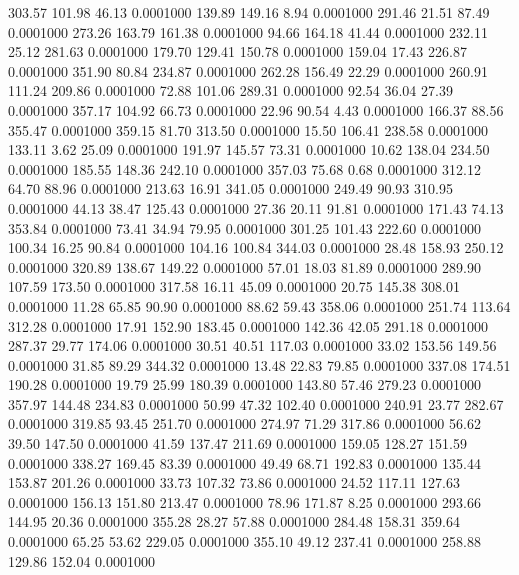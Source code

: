  303.57  101.98   46.13   0.0001000
 139.89  149.16    8.94   0.0001000
 291.46   21.51   87.49   0.0001000
 273.26  163.79  161.38   0.0001000
  94.66  164.18   41.44   0.0001000
 232.11   25.12  281.63   0.0001000
 179.70  129.41  150.78   0.0001000
 159.04   17.43  226.87   0.0001000
 351.90   80.84  234.87   0.0001000
 262.28  156.49   22.29   0.0001000
 260.91  111.24  209.86   0.0001000
  72.88  101.06  289.31   0.0001000
  92.54   36.04   27.39   0.0001000
 357.17  104.92   66.73   0.0001000
  22.96   90.54    4.43   0.0001000
 166.37   88.56  355.47   0.0001000
 359.15   81.70  313.50   0.0001000
  15.50  106.41  238.58   0.0001000
 133.11    3.62   25.09   0.0001000
 191.97  145.57   73.31   0.0001000
  10.62  138.04  234.50   0.0001000
 185.55  148.36  242.10   0.0001000
 357.03   75.68    0.68   0.0001000
 312.12   64.70   88.96   0.0001000
 213.63   16.91  341.05   0.0001000
 249.49   90.93  310.95   0.0001000
  44.13   38.47  125.43   0.0001000
  27.36   20.11   91.81   0.0001000
 171.43   74.13  353.84   0.0001000
  73.41   34.94   79.95   0.0001000
 301.25  101.43  222.60   0.0001000
 100.34   16.25   90.84   0.0001000
 104.16  100.84  344.03   0.0001000
  28.48  158.93  250.12   0.0001000
 320.89  138.67  149.22   0.0001000
  57.01   18.03   81.89   0.0001000
 289.90  107.59  173.50   0.0001000
 317.58   16.11   45.09   0.0001000
  20.75  145.38  308.01   0.0001000
  11.28   65.85   90.90   0.0001000
  88.62   59.43  358.06   0.0001000
 251.74  113.64  312.28   0.0001000
  17.91  152.90  183.45   0.0001000
 142.36   42.05  291.18   0.0001000
 287.37   29.77  174.06   0.0001000
  30.51   40.51  117.03   0.0001000
  33.02  153.56  149.56   0.0001000
  31.85   89.29  344.32   0.0001000
  13.48   22.83   79.85   0.0001000
 337.08  174.51  190.28   0.0001000
  19.79   25.99  180.39   0.0001000
 143.80   57.46  279.23   0.0001000
 357.97  144.48  234.83   0.0001000
  50.99   47.32  102.40   0.0001000
 240.91   23.77  282.67   0.0001000
 319.85   93.45  251.70   0.0001000
 274.97   71.29  317.86   0.0001000
  56.62   39.50  147.50   0.0001000
  41.59  137.47  211.69   0.0001000
 159.05  128.27  151.59   0.0001000
 338.27  169.45   83.39   0.0001000
  49.49   68.71  192.83   0.0001000
 135.44  153.87  201.26   0.0001000
  33.73  107.32   73.86   0.0001000
  24.52  117.11  127.63   0.0001000
 156.13  151.80  213.47   0.0001000
  78.96  171.87    8.25   0.0001000
 293.66  144.95   20.36   0.0001000
 355.28   28.27   57.88   0.0001000
 284.48  158.31  359.64   0.0001000
  65.25   53.62  229.05   0.0001000
 355.10   49.12  237.41   0.0001000
 258.88  129.86  152.04   0.0001000
